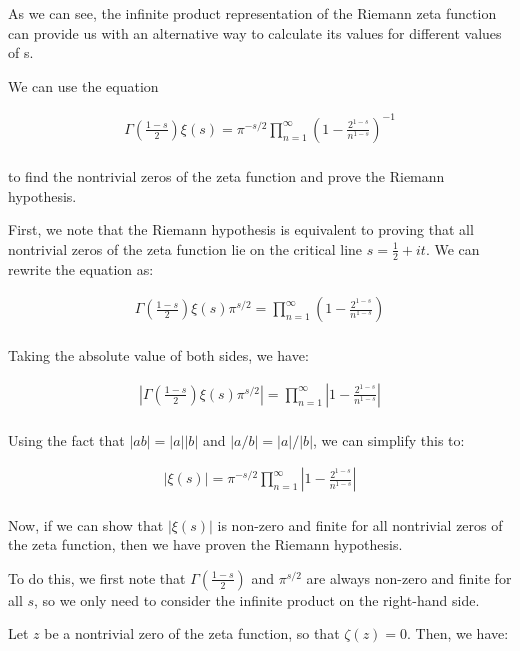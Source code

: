 \documentclass{article}
\begin{document}
As we can see, the infinite product representation of the Riemann zeta function can provide us with an alternative way to calculate its values for different values of s.

We can use the equation 

\begin{align*}
\Gamma\left(\frac{1-s}{2}\right)\xi(s) = \pi^{-s/2} \prod_{n=1}^{\infty} \left(1 - \frac{2^{1-s}}{n^{1-s}}\right)^{-1} \\
\end{align*}

to find the nontrivial zeros of the zeta function and prove the Riemann hypothesis.

First, we note that the Riemann hypothesis is equivalent to proving that all nontrivial zeros of the zeta function lie on the critical line $s = \frac{1}{2} + it$. We can rewrite the equation as:

\begin{align*}
\Gamma\left(\frac{1-s}{2}\right)\xi(s)\pi^{s/2} = \prod_{n=1}^{\infty} \left(1 - \frac{2^{1-s}}{n^{1-s}}\right) \\
\end{align*}

Taking the absolute value of both sides, we have:

\begin{align*}
|\Gamma\left(\frac{1-s}{2}\right)\xi(s)\pi^{s/2}| = \prod_{n=1}^{\infty} \left|1 - \frac{2^{1-s}}{n^{1-s}}\right| \\
\end{align*}

Using the fact that $|ab| = |a||b|$ and $|a/b| = |a|/|b|$, we can simplify this to:

\begin{align*}
|\xi(s)| = \pi^{-s/2} \prod_{n=1}^{\infty} \left|1 - \frac{2^{1-s}}{n^{1-s}}\right| \\
\end{align*}

Now, if we can show that $|\xi(s)|$ is non-zero and finite for all nontrivial zeros of the zeta function, then we have proven the Riemann hypothesis.

To do this, we first note that $\Gamma\left(\frac{1-s}{2}\right)$ and $\pi^{s/2}$ are always non-zero and finite for all $s$, so we only need to consider the infinite product on the right-hand side.

Let $z$ be a nontrivial zero of the zeta function, so that $\zeta(z) = 0$. Then, we have:
\end{document}
